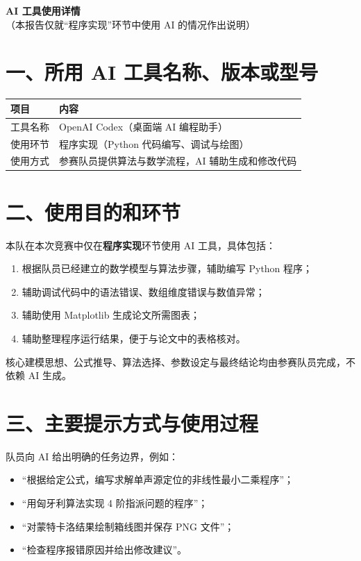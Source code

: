 \documentclass[12pt,a4paper]{ctexart}
\begin{document}
\begin{center}
{\bfseries AI 工具使用详情}\\[1ex]
{\normalsize（本报告仅就“程序实现”环节中使用 AI 的情况作出说明）}
\end{center}

\section*{一、所用 AI 工具名称、版本或型号}

\begin{table}[h]
\centering
\begin{tabular}{ll}
\toprule
项目 & 内容 \\
\midrule
工具名称 & OpenAI Codex（桌面端 AI 编程助手）\\
使用环节 & 程序实现（Python 代码编写、调试与绘图）\\
使用方式 & 参赛队员提供算法与数学流程，AI 辅助生成和修改代码 \\
\bottomrule
\end{tabular}
\end{table}

\section*{二、使用目的和环节}

本队在本次竞赛中仅在\textbf{程序实现}环节使用 AI 工具，具体包括：

\begin{enumerate}
  \item 根据队员已经建立的数学模型与算法步骤，辅助编写 Python 程序；
  \item 辅助调试代码中的语法错误、数组维度错误与数值异常；
  \item 辅助使用 Matplotlib 生成论文所需图表；
  \item 辅助整理程序运行结果，便于与论文中的表格核对。
\end{enumerate}

核心建模思想、公式推导、算法选择、参数设定与最终结论均由参赛队员完成，不依赖 AI 生成。

\section*{三、主要提示方式与使用过程}

队员向 AI 给出明确的任务边界，例如：

\begin{itemize}
  \item “根据给定公式，编写求解单声源定位的非线性最小二乘程序”；
  \item “用匈牙利算法实现 4 阶指派问题的程序”；
  \item “对蒙特卡洛结果绘制箱线图并保存 PNG 文件”；
  \item “检查程序报错原因并给出修改建议”。
\end{itemize}
\end{document}
